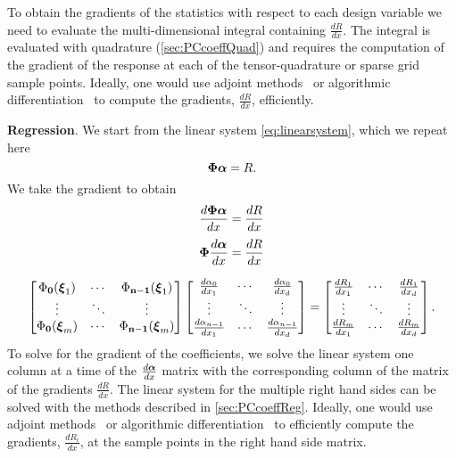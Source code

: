 To obtain the gradients of the statistics with respect to each design variable we need to evaluate the multi-dimensional integral containing $\frac{dR}{dx}$. The integral is evaluated with quadrature (\cref{sec:PCcoeffQuad}) and requires the computation of the gradient of the response at each of the tensor-quadrature or sparse grid sample points. Ideally, one would use adjoint methods~\cite{Giles2000} or algorithmic differentiation~\cite{Griewank2008} to compute the gradients, $\frac{dR}{dx}$, efficiently.

\textbf{Regression}.
We start from the linear system \cref{eq:linearsystem}, which we repeat here
\begin{equation}
  \boldsymbol{\Phi} \boldsymbol{\alpha} = R.
\end{equation}
We take the gradient to obtain
\begin{equation}
  \frac{d\boldsymbol{\Phi} \boldsymbol{\alpha}}{dx} = \frac{dR}{dx}
\end{equation}
\begin{equation}
  \boldsymbol{\Phi} \frac{d\boldsymbol{\alpha}}{dx} = \frac{dR}{dx}
\end{equation}

\begin{equation}
  \begin{bmatrix}
    \Phi_\mathbf{0}(\boldsymbol{\xi}_1) & \cdots & \Phi_\mathbf{n-1}(\boldsymbol{\xi}_1) \\
    \vdots & \ddots & \vdots \\
    \Phi_\mathbf{0}(\boldsymbol{\xi}_m)  &\cdots & \Phi_\mathbf{n-1}(\boldsymbol{\xi}_m)
  \end{bmatrix}
  \begin{bmatrix}
    \frac{d\alpha_0}{dx_1} & \cdots & \frac{d\alpha_0}{dx_d}\\
    \vdots & \ddots & \vdots \\
    \frac{d\alpha_{n-1}}{dx_1} & \cdots & \frac{d\alpha_{n-1}}{dx_d}
    \end{bmatrix}
    =
  \begin{bmatrix}
    \frac{dR_1}{dx_1} & \cdots & \frac{dR_1}{dx_d} \\
    \vdots & \ddots & \vdots \\
    \frac{dR_m}{dx_1} & \cdots & \frac{dR_m}{dx_d}
  \end{bmatrix}.
\end{equation}
To solve for the gradient of the coefficients, we solve the linear system one column at a time of the $ \frac{d\boldsymbol{\alpha}}{dx} $ matrix with the corresponding column of the matrix of the gradients $ \frac{dR}{dx} $.
The linear system for the multiple right hand sides can be solved with the methods described in \cref{sec:PCcoeffReg}. Ideally, one would use adjoint methods~\cite{Giles2000} or algorithmic differentiation~\cite{Griewank2008} to efficiently compute the gradients, $\frac{dR_i}{dx}$, at the sample points in the right hand side matrix.

